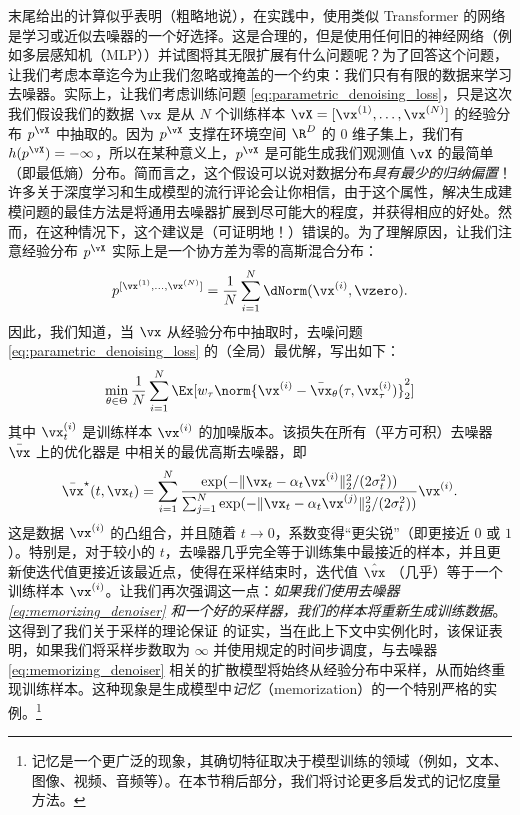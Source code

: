 \documentclass[../../book-main_zh.tex]{subfiles}
\begin{document}
 末尾给出的计算似乎表明（粗略地说），在实践中，使用类似 Transformer 的网络是学习或近似去噪器的一个好选择。这是合理的，但是使用任何旧的神经网络（例如多层感知机（MLP））并试图将其无限扩展有什么问题呢？为了回答这个问题，让我们考虑本章迄今为止我们忽略或掩盖的一个约束：我们只有有限的数据来学习去噪器。实际上，让我们考虑训练问题 \eqref{eq:parametric_denoising_loss}，只是这次我们假设我们的数据 \(\vx\) 是从 \(N\) 个训练样本 \(\vX = [\vx^{(1)}, \dots, \vx^{(N)}]\) 的经验分布 \(p^{\vX}\) 中抽取的。因为 \(p^{\vX}\) 支撑在环境空间 \(\R^{D}\) 的 \(0\) 维子集上，我们有 \(h(p^{\vX}) = -\infty\)，所以在某种意义上，\(p^{\vX}\) 是可能生成我们观测值 \(\vX\) 的最简单（即最低熵）分布。简而言之，这个假设可以说对数据分布\textit{具有最少的归纳偏置}！许多关于深度学习和生成模型的流行评论会让你相信，由于这个属性，解决生成建模问题的最佳方法是将通用去噪器扩展到尽可能大的程度，并获得相应的好处。然而，在这种情况下，这个建议是（可证明地！）错误的。为了理解原因，让我们注意经验分布 \(p^{\vX}\) 实际上是一个协方差为零的高斯混合分布：
\begin{equation}
    p^{[\vx^{(1)}, \dots, \vx^{(N)}]} = \frac{1}{N}\sum_{i =
    1}^{N}\dNorm(\vx^{(i)}, \vzero).
\end{equation}
因此，我们知道，当 \(\vx\) 从经验分布中抽取时，去噪问题 \eqref{eq:parametric_denoising_loss} 的（全局）最优解，写出如下：
\begin{equation}\label{eq:parametric_denoising_loss_finite_sample}
    \min_{\theta \in \Theta}\frac{1}{N}\sum_{i =
    1}^{N}\Ex[w_{\tau}\norm{\vx^{(i)} - \bar{\vx}_{\theta}(\tau,
    \vx_{\tau}^{(i)})}_{2}^{2}]
\end{equation}
其中 \(\vx_{t}^{(i)}\) 是训练样本 \(\vx^{(i)}\) 的加噪版本。该损失在所有（平方可积）去噪器 \(\bar{\vx}\) 上的优化器是  中相关的最优高斯去噪器，即
\begin{equation}\label{eq:memorizing_denoiser}
    \bar{\vx}^{\star}(t, \vx_{t}) = \sum_{i =
    1}^{N}\frac{\exp({-\|\vx_{t} -
    \alpha_{t}\vx^{(i)}\|_{2}^{2}/(2\sigma_{t}^{2})})}{\sum_{j =
        1}^{N}\exp({-\|\vx_{t} -
    \alpha_{t}\vx^{(j)}\|_{2}^{2}/(2\sigma_{t}^{2})})}\vx^{(i)}.
\end{equation}
这是数据 \(\vx^{(i)}\) 的凸组合，并且随着 \(t \to 0\)，系数变得“更尖锐”（即更接近 \(0\) 或 \(1\)）。特别是，对于较小的 \(t\)，去噪器几乎完全等于训练集中最接近的样本，并且更新使迭代值更接近该最近点，使得在采样结束时，迭代值 \(\hat{\vx}\) （几乎）等于一个训练样本 \(\vx^{(i)}\)。让我们再次强调这一点：\textit{如果我们使用去噪器 \eqref{eq:memorizing_denoiser} 和一个好的采样器，我们的样本将重新生成训练数据}。这得到了我们关于采样的理论保证  的证实，当在此上下文中实例化时，该保证表明，如果我们将采样步数取为 \(\infty\) 并使用规定的时间步调度，与去噪器 \eqref{eq:memorizing_denoiser} 相关的扩散模型将始终从经验分布中采样，从而始终重现训练样本。这种现象是生成模型中\textit{记忆}（memorization）的一个特别严格的实例。\footnote{记忆是一个更广泛的现象，其确切特征取决于模型训练的领域（例如，文本、图像、视频、音频等）。在本节稍后部分，我们将讨论更多启发式的记忆度量方法。}
\end{document}
